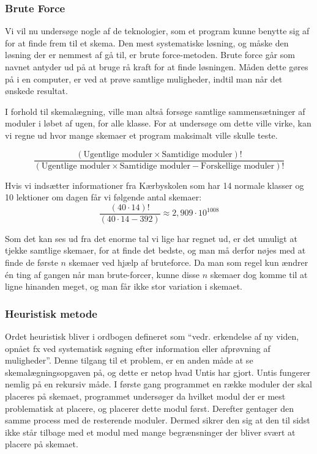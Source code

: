 \subsubsection{Brute Force}
Vi vil nu undersøge nogle af de teknologier, som et program kunne benytte sig af for at finde frem til et skema. Den mest systematiske løsning, og måske den løsning der er nemmest af gå til, er brute force-metoden. Brute force går som navnet antyder ud på at bruge rå kraft for at finde løsningen. Måden dette gøres på i en computer, er ved at prøve samtlige muligheder, indtil man når det ønskede resultat\cite{BruteForce}.

I forhold til skemalægning, ville man altså forsøge samtlige sammensætninger af moduler i løbet af ugen, for alle klasse. For at undersøge om dette ville virke, kan vi regne ud hvor mange skemaer et program maksimalt ville skulle teste.

$$ \frac{(\text{Ugentlige moduler} \times \text{Samtidige moduler})!}{(\text{Ugentlige moduler} \times \text{Samtidige moduler} - \text{Forskellige moduler})!} $$

Hvis vi indsætter informationer fra Kærbyskolen som har 14 normale klasser og 10 lektioner om dagen får vi følgende antal skemaer:
$$ \frac{(40 \cdot 14)!}{(40 \cdot 14 - 392)} \approx 2,909\cdot 10^{1008} $$

Som det kan ses ud fra det enorme tal vi lige har regnet ud, er det umuligt at tjekke samtlige skemaer, for at finde det bedste, og man må derfor nøjes med at finde de første $n$ skemaer ved hjælp af bruteforce. Da man som regel kun ændrer \'en ting af gangen når man brute-forcer, kunne disse $n$ skemaer dog komme til at ligne hinanden meget, og man får ikke stor variation i skemaet.

\subsubsection{Heuristisk metode}
Ordet heuristisk bliver i ordbogen defineret som ``vedr. erkendelse af ny viden, opnået fx ved systematisk søgning efter information eller afprøvning af muligheder''\cite{Ordnet}. Denne tilgang til et problem, er en anden måde at se skemalægningsopgaven på, og dette er netop hvad Untis har gjort\cite[s.~27]{UntisBeskrivelse}. Untis fungerer nemlig på en rekursiv måde. I første gang programmet en række moduler der skal placeres på skemaet, programmet undersøger da hvilket modul der er mest problematisk at placere, og placerer dette modul først. Derefter gentager den samme process med de resterende moduler. Dermed sikrer den sig at den til sidst ikke står tilbage med et modul med mange begrænsninger der bliver svært at placere på skemaet. 


